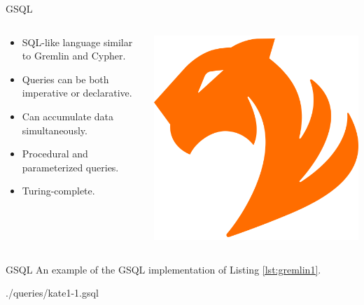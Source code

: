 \begin{frame}{GSQL}
    \begin{columns}
        \begin{column}{.6\textwidth}
            \begin{itemize}
                \item SQL-like language similar to Gremlin and Cypher.
                \item Queries can be both imperative or declarative.
                \item Can accumulate data simultaneously.
                \item Procedural and parameterized queries.
                \item Turing-complete.
            \end{itemize}
            \end{column}%
            \hfill%
            \begin{column}{.39\textwidth}
            \centering
            \includegraphics[width=0.7\columnwidth]{img/database-logos/tigergraph.png}
        \end{column}%
    \end{columns}
\end{frame}

\begin{frame}{GSQL}
    An example of the GSQL implementation of Listing \ref{lst:gremlin1}.

    {./queries/kate1-1.gsql}
\end{frame}

